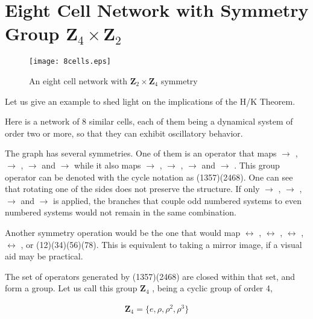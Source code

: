 \chapter{Eight Cell Network with Symmetry Group $\mathbf{Z}_4 \times \mathbf{Z}_2$}
\thispagestyle{empty}


\begin{figure}[H]
\label{8cell}
\center
\texttt{[image: 8cells.eps]}
\caption{An eight cell network with $\mathbf{Z}_2 \times \mathbf{Z}_4$ symmetry}
\end{figure}

Let us give an example to shed light on the implications of the H/K Theorem.

Here is a network of 8 similar cells, each of them being a dynamical system of order two or more, so that they can exhibit oscillatory behavior. 

The graph has several symmetries. One of them is an operator that maps  $\longrightarrow$ , $\longrightarrow$ , $\longrightarrow$  and  $\longrightarrow$  while it also maps   $\longrightarrow$ , $\longrightarrow$ , $\longrightarrow$  and  $\longrightarrow$ . This group operator can be denoted with the cycle notation as (1357)(2468). One can see that rotating one of the sides does not preserve the structure. If only  $\longrightarrow$ , $\longrightarrow$ ,  $\longrightarrow$  and   $\longrightarrow$   is applied, the branches that couple odd numbered systems to even numbered systems would not remain in the same combination. 

Another symmetry operation would be the one that would map  $\longleftrightarrow$  ,  $\longleftrightarrow$ ,  $\longleftrightarrow$ ,  $\longleftrightarrow$ , or (12)(34)(56)(78). This is equivalent to taking a mirror image, if a visual aid may be practical. 

The set of operators generated by (1357)(2468) are closed within that set, and form a group. Let us call this group $\mathbf{Z}_4$ , being a cyclic group of order 4,

\begin{align}
\mathbf{Z}_4 = \{e, \rho , \rho^2, \rho^3\}
\end{align}

